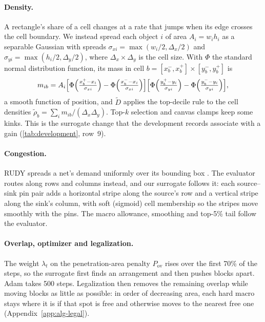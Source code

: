 \paragraph{Density.} A rectangle's share of a cell changes at a rate that jumps when
its edge crosses the cell boundary. We instead spread each object $i$ of area
$A_i=w_ih_i$ as a separable Gaussian with spreads $\sigma_{xi}=\max(w_i/2,\Delta_x/2)$
and $\sigma_{yi}=\max(h_i/2,\Delta_y/2)$, where $\Delta_x\times\Delta_y$ is the cell
size. With $\Phi$ the standard normal distribution function, its mass in cell
$b=[x_b^-,x_b^+]\times[y_b^-,y_b^+]$ is
\begin{equation}
m_{ib}=A_i
\Bigl[\Phi\Bigl(\tfrac{x_b^+-x_i}{\sigma_{xi}}\Bigr)-
      \Phi\Bigl(\tfrac{x_b^--x_i}{\sigma_{xi}}\Bigr)\Bigr]
\Bigl[\Phi\Bigl(\tfrac{y_b^+-y_i}{\sigma_{yi}}\Bigr)-
      \Phi\Bigl(\tfrac{y_b^--y_i}{\sigma_{yi}}\Bigr)\Bigr],
\label{eq:gaussian-density}
\end{equation}
a smooth function of position, and $\widetilde D$ applies the top-decile rule to the
cell densities $\tilde\rho_b=\sum_im_{ib}/(\Delta_x\Delta_y)$. Top-$k$ selection and
canvas clamps keep some kinks. This is the surrogate change that the development
records associate with a gain (\cref{tab:development}, row~9).

\paragraph{Congestion.} RUDY spreads a net's demand uniformly over its bounding box
\citep{spindler2007rudy}. The evaluator routes along rows and columns instead, and
our surrogate follows it: each source--sink pin pair adds a horizontal stripe along
the source's row and a vertical stripe along the sink's column, with soft (sigmoid)
cell membership so the stripes move smoothly with the pins. The macro allowance,
smoothing and top-5\% tail follow the evaluator.

\paragraph{Overlap, optimizer and legalization.} The weight $\lambda_t$ on the
penetration-area penalty $P_{\mathrm{ov}}$ rises over the first 70\% of the steps,
so the surrogate first finds an arrangement and then pushes blocks apart. Adam
\citep{kingma2015adam} takes 500 steps. Legalization then removes the remaining
overlap while moving blocks as little as possible: in order of decreasing area, each
hard macro stays where it is if that spot is free and otherwise moves to the nearest
free one (Appendix~\ref{app:alg-legal}).

